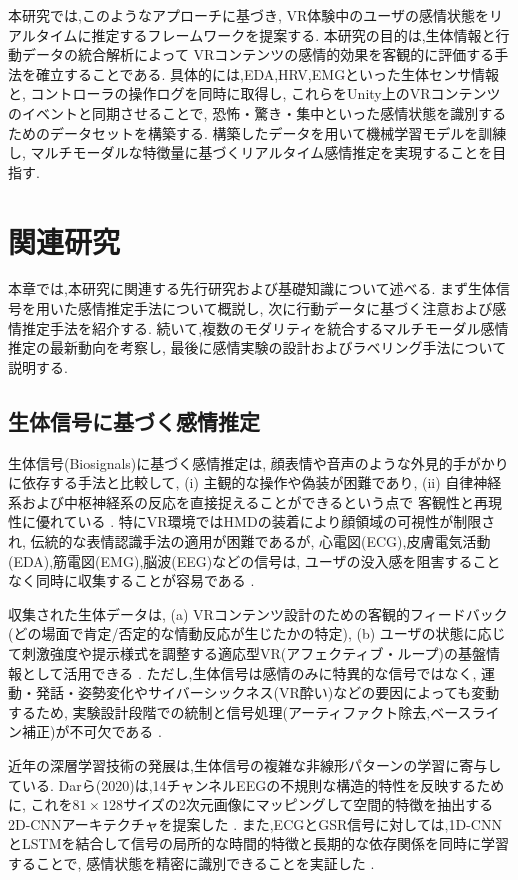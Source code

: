 \documentclass[book,paper=a4,fontsize=10pt,jafontscale=0.92]{jlreq}
\begin{document}
本研究では,このようなアプローチに基づき,
VR体験中のユーザの感情状態をリアルタイムに推定するフレームワークを提案する.
本研究の目的は,生体情報と行動データの統合解析によって
VRコンテンツの感情的効果を客観的に評価する手法を確立することである.
具体的には,EDA,HRV,EMGといった生体センサ情報と,
コントローラの操作ログを同時に取得し,
これらをUnity上のVRコンテンツのイベントと同期させることで,
恐怖・驚き・集中といった感情状態を識別するためのデータセットを構築する.
構築したデータを用いて機械学習モデルを訓練し,
マルチモーダルな特徴量に基づくリアルタイム感情推定を実現することを目指す.



\chapter{関連研究}

本章では,本研究に関連する先行研究および基礎知識について述べる.
まず生体信号を用いた感情推定手法について概説し,
次に行動データに基づく注意および感情推定手法を紹介する.
続いて,複数のモダリティを統合するマルチモーダル感情推定の最新動向を考察し,
最後に感情実験の設計およびラベリング手法について説明する.

\section{生体信号に基づく感情推定}

生体信号(Biosignals)に基づく感情推定は,
顔表情や音声のような外見的手がかりに依存する手法と比較して,
(i) 主観的な操作や偽装が困難であり,
(ii) 自律神経系および中枢神経系の反応を直接捉えることができるという点で
客観性と再現性に優れている \cite{MarinMorales2020}.
特にVR環境ではHMDの装着により顔領域の可視性が制限され,
伝統的な表情認識手法の適用が困難であるが,
心電図(ECG),皮膚電気活動(EDA),筋電図(EMG),脳波(EEG)などの信号は,
ユーザの没入感を阻害することなく同時に収集することが容易である \cite{MarinMorales2020, Liao2020DesignAE}.

収集された生体データは,
(a) VRコンテンツ設計のための客観的フィードバック(どの場面で肯定/否定的な情動反応が生じたかの特定),
(b) ユーザの状態に応じて刺激強度や提示様式を調整する適応型VR(アフェクティブ・ループ)の基盤情報として活用できる \cite{MarinMorales2020, OrozcoMora2024}.
ただし,生体信号は感情のみに特異的な信号ではなく,
運動・発話・姿勢変化やサイバーシックネス(VR酔い)などの要因によっても変動するため,
実験設計段階での統制と信号処理(アーティファクト除去,ベースライン補正)が不可欠である \cite{MarinMorales2020}.

近年の深層学習技術の発展は,生体信号の複雑な非線形パターンの学習に寄与している.
Darら(2020)は,14チャンネルEEGの不規則な構造的特性を反映するために,
これを$81 \times 128$サイズの2次元画像にマッピングして空間的特徴を抽出する2D-CNNアーキテクチャを提案した \cite{Dar2020}.
また,ECGとGSR信号に対しては,1D-CNNとLSTMを結合して信号の局所的な時間的特徴と長期的な依存関係を同時に学習することで,
感情状態を精密に識別できることを実証した \cite{Dar2020}.
\end{document}
